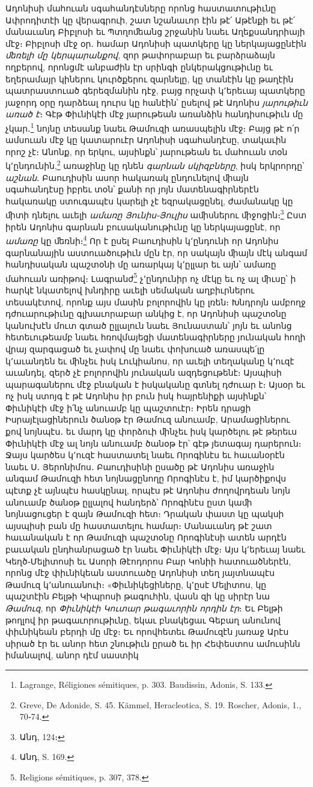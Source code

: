 \documentclass{article}
\begin{document}
{Ադոնիսի մահուան սգահանդէսները որոնց հաստատութիւնը Ափրոդիտէի կը վերագրուի, շատ նշանաւոր էին թէ՛ Աթէնքի եւ թէ՛ մանաւանդ Բիբլոսի եւ Պտղոﬔանց շրջանին նաեւ Աղեքսանդրիայի մէջ։ Բիբլոսի մէջ օր․ համար Ադոնիսի պատկերը կը ներկայացընէին \emph{ﬔռելի մը կերպարանքով}, զոր թափորաբար եւ բարձրաձայն ողբերով, որոնցմէ անբաժին էր սրինգի ընկերակցութիւնը եւ եղերամայր կիներու կուրծքերու զարնելը, կը տանէին կը թաղէին պատրաստուած գերեզմանին դէջ, բայց որչափ կ՚երեւայ պատկերը յաջորդ օրը դարձեալ դուրս կը հանէին՝ ըսելով թէ Ադոնիս \emph{յարութիւն առած է}։ Գէթ Փիւնիկէի մէջ յարութեան առանձին հանդիսութիւն մը չկար․\footnote{Lagrange, Réligiones sémitiques, p. 303. Baudissin, Adonis, S. 133.} նոյնը տեսանք նաեւ Թամուզի առասպելին մէջ։ Բայց թէ ո՛ր ամսուան մէջ կը կատարուէր Ադոնիսի սգահանդէսը, տակաւին որոշ չէ։ Անոնք, որ երկու, այսինքն՝ յարութեան եւ մահուան տօն կ՚ընդունին,\footnote{Greve, De Adonide, S. 45. Kämmel, Heracleotica, S. 19. Roscher, Adonis, 1., 70֊74.} առաջինը կը դնեն \emph{գարնան սկիզբները}, իսկ երկրորդը՝ \emph{աշնան}․ Բաուդիսին ասոր հակառակ ընդունելով ﬕայն սգահանդէսը իբրեւ տօն՝ քանի որ յոյն մատենագիրներէն հակառակը ստուգապէս կարելի չէ եզրակացընել, ժամանակը կը ﬕտի դնելու աւելի \emph{ամառը Յունիս֊Յուլիս} աﬕսներու ﬕջոցին։\footnote{Անդ, 124։} Ըստ իրեն Ադոնիս գարնան բուսականութիւնը կը ներկայացընէ, որ \emph{ամառը} կը ﬔռնի։\footnote{Անդ, S. 169.} Որ է ըսել Բաուդիսին կ՚ընդունի որ Ադոնիս գարնանային աստուածութիւն մըն էր, որ սակայն ﬕայն մէկ անգամ հանդիսական պաշտօնի մը առարկայ կ՚ըլլար եւ այն՝ ամառը մահուան առիթով։ Լագրանժ\footnote{Religions sémitiques, p. 307, 378.} չ՚ընդունիր ոչ մէկը եւ ոչ ալ ﬕւսը՝ ի հարկէ նկատելով խնդիրը աւելի սեմական աղբիւրներու տեսակէտով, որոնք այս մասին բոլորովին կը լռեն։ Խնդրոյն ամբողջ դժուարութիւնը գլխաւորաբար անկից է, որ Ադոնիսի պաշտօնը կանուխէն մուտ գտած ըլլալուն նաեւ Յունաստան՝ յոյն եւ անոնց հետեւութեամբ նաեւ հռովմայեցի մատենագիրները յունական հողի վրայ զարգացած եւ չափով մը նաեւ փոխուած առասպե՛լը կ՚աւանդեն եւ ﬕնչեւ իսկ Լուկիանոս, որ աւելի տեղականը կ՚ուզէ աւանդել, զերծ չէ բոլորովին յունական ազդեցութենէ։ Այսպիսի պարագաներու մէջ բնական է իսկականը գտնել դժուար է։ Այսօր եւ ոչ իսկ ստոյգ է թէ Ադոնիս իր բուն իսկ հայրենիքի այսինքն՝ Փիւնիկէի մէջ ի՛նչ անուամբ կը պաշտուէր։ Իրեն դրացի Իսրայէլացիներուն ծանօթ էր Թամուզ անուամբ, Արամացիներու քով նոյնպէս․ եւ մարդ կը փորձուի ﬕնչեւ իսկ կարծելու թէ թերեւս Փիւնիկէի մէջ ալ նոյն անուամբ ծանօթ էր՝ գէթ յետագայ դարերուն։ Ջայս կարծես կ՚ուզէ հաստատել նաեւ Որոգինէս եւ հաւանօրէն նաեւ Ս․ Յերոնիմոս․ Բաուդիսինի ըսածը թէ Ադոնիս առաջին անգամ Թամուզի հետ նոյնացընողը Որոգինէս է, իմ կարծիքովս պէտք չէ այնպէս հասկընալ, որպէս թէ Ադոնիս ժողովրդեան նոյն անուամբ ծանօթ ըլլալով հանդերձ՝ Որոգինէս ըստ կաﬕ նոյնացուցեր է զայն Թամուզի հետ։ Դրական փաստ կը պակսի այսպիսի բան մը հաստատելու համար։ Մանաւանդ թէ շատ հաւանական է որ Թամուզի պաշտօնը Որոգինէսի ատեն արդէն բաւական ընդհանրացած էր նաեւ Փիւնիկէի մէջ։ Այս կ՚երեւայ նաեւ Կեղծ֊Մելիտոսի եւ Ասորի Թէոդորոս Բար Կոնիի հատուածներէն, որոնց մէջ փիւնիկեան աստուածը Ադոնիսի տեղ յայտնապէս Թամուզ կ՚անուանուի։ «Փիւնիկեցիները, կ՚ըսէ Մելիտոս, կը պաշտէին Բելթի Կիպրոսի թագուհին, վասն զի կը սիրէր նա \emph{Թամուզ}, որ \emph{Փիւնիկէի Կուտար թագաւորին որդին էր}։ Եւ Բելթի թողլով իր թագաւորութիւնը, եկաւ բնակեցաւ Գեբաղ անունով փիւնիկեան բերդի մը մէջ։ Եւ որովհետեւ Թամուզէն յառաջ Արէս սիրած էր եւ անոր հետ շնութիւն ըրած եւ իր Հեփեստոս ամուսինն իմանալով, անոր դէմ սաստիկ }
\end{document}
